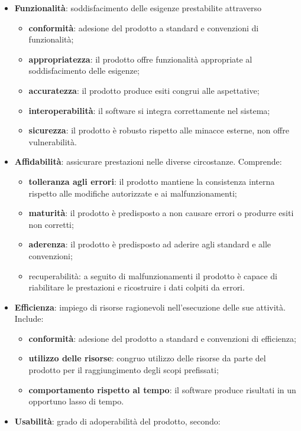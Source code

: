\begin{itemize}
	\item \textbf{Funzionalità}: soddisfacimento delle esigenze prestabilite attraverso
	\begin{itemize}
		\item \textbf{conformità}: adesione del prodotto a standard e convenzioni di funzionalità;
		\item \textbf{appropriatezza}: il prodotto offre funzionalità appropriate al soddisfacimento delle esigenze;
		\item \textbf{accuratezza}: il prodotto produce esiti congrui alle aspettative;
		\item \textbf{interoperabilità}: il software si integra correttamente nel sistema;
		\item \textbf{sicurezza}: il prodotto è robusto rispetto alle minacce esterne, non offre vulnerabilità.
	\end{itemize}
	\item \textbf{Affidabilità}: assicurare prestazioni nelle diverse circostanze. Comprende:
	\begin{itemize}
		\item \textbf{tolleranza agli errori}: il prodotto mantiene la consistenza interna rispetto alle modifiche autorizzate e ai malfunzionamenti;
		\item \textbf{maturità}: il prodotto è predisposto a non causare errori o  produrre esiti non corretti;
		\item \textbf{aderenza}: il prodotto è predisposto ad aderire agli standard e alle convenzioni;
		\item recuperabilità: a seguito di malfunzionamenti il prodotto è capace di riabilitare le prestazioni e ricostruire i dati colpiti da errori.
	\end{itemize}
	\item \textbf{Efficienza}: impiego di risorse ragionevoli nell'esecuzione delle sue attività. Include:
	\begin{itemize}
		\item \textbf{conformità}: adesione del prodotto a standard e convenzioni di efficienza;
		\item \textbf{utilizzo delle risorse}: congruo utilizzo delle risorse da parte del prodotto per il raggiungimento degli scopi prefissati;
		\item \textbf{comportamento rispetto al tempo}: il software produce risultati in un opportuno lasso di tempo.
	\end{itemize}
	\item \textbf{Usabilità}: grado di adoperabilità del prodotto, secondo:

\end{itemize}
